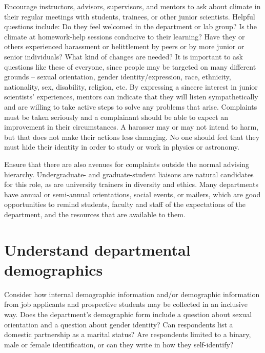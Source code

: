 Encourage instructors, advisors, supervisors, and mentors to ask about climate in their regular meetings with students, trainees, or other junior scientists. Helpful questions include: Do they feel welcomed in the department or lab group? Is the climate at homework-help sessions conducive to their learning? Have they or others experienced harassment or belittlement by peers or by more junior or senior individuals? What kind of changes are needed? It is important to ask questions like these of everyone, since people may be targeted on many different grounds -- sexual orientation, gender identity/expression, race, ethnicity, nationality, sex, disability, religion, etc. By expressing a sincere interest in junior scientists' experiences, mentors can indicate that they will listen sympathetically and are willing to take active steps to solve any problems that arise. Complaints must be taken seriously and a complainant should be able to expect an improvement in their circumstances. A harasser may or may not intend to harm, but that does not make their actions less damaging. No one should feel that they must hide their identity in order to study or work in physics or astronomy.

Ensure that there are also avenues for complaints outside the normal advising hierarchy. Undergraduate- and graduate-student liaisons are natural candidates for this role, as are university trainers in diversity and ethics. Many departments have annual or semi-annual orientations, social events, or mailers, which are good opportunities to remind students, faculty and staff of the expectations of the department, and the resources that are available to them.



\section {Understand departmental demographics}
\label{demographics}
Consider how internal demographic information and/or demographic information from job applicants and prospective students may be collected in an inclusive way. Does the department's demographic form include a question about sexual orientation and a question about gender identity? Can respondents list a domestic partnership as a marital status? Are respondents limited to a binary, male or female identification, or can they write in how they self-identify?

